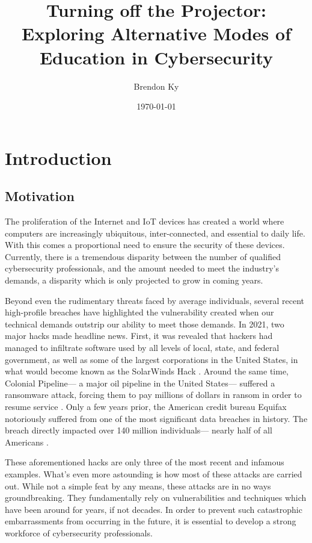 \documentclass{article}
\title{
    Turning off the Projector: \\
    \large Exploring Alternative Modes of Education in Cybersecurity
}
\author{Brendon Ky}
\date{\today}
\begin{document}
\maketitle

\section{Introduction}

    \subsection{Motivation} 
    The proliferation of the Internet and IoT devices has created a world where computers are increasingly ubiquitous, inter-connected, and essential to daily life. %
With this comes a proportional need to ensure the security of these devices. %
Currently, there is a tremendous disparity between the number of qualified cybersecurity professionals, and the amount needed to meet the industry's demands, a disparity which is only projected to grow in coming years.
    
    Beyond even the rudimentary threats faced by average individuals, several recent high-profile breaches have highlighted the vulnerability created when our technical demands outstrip our ability to meet those demands. %
In 2021, two major hacks made headline news. %
First, it was revealed that hackers had managed to infiltrate software used by all levels of local, state, and federal government, as well as some of the largest corporations in the United States, in what would become known as the SolarWinds Hack \cite{CRS-SolarWinds, GAO-SolarWinds}.
    Around the same time, Colonial Pipeline---%
a major oil pipeline in the United States---%
suffered a ransomware attack, forcing them to pay millions of dollars in ransom in order to resume service \cite{CRS-ColonialPipeline, DOJ-ColonialPipeline}. %
Only a few years prior, the American credit bureau Equifax notoriously suffered from one of the most significant data breaches in history. %
The breach directly impacted over 140 million individuals---%
nearly half of all Americans \cite{CRS-Equifax}. 
    
    These aforementioned hacks are only three of the most recent and infamous examples. %
What's even more astounding is how most of these attacks are carried out. %
While not a simple feat by any means, these attacks are in no ways groundbreaking. %
They fundamentally rely on vulnerabilities and techniques which have been around for years, if not decades. %
In order to prevent such catastrophic embarrassments from occurring in the future, it is essential to develop a strong workforce of cybersecurity professionals. 
\end{document}

